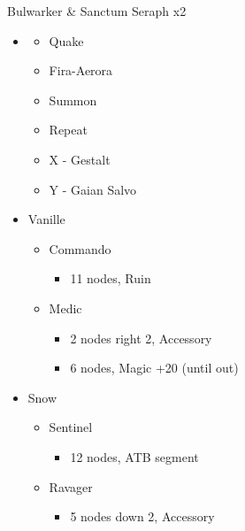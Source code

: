 \begin{multicols}{2}
\begin{battle}{Bulwarker \& Sanctum Seraph x2}
\begin{itemize}
    \item \second
    \begin{itemize}
        \item Quake
        \item Fira-Aerora
        \item Summon
        \item Repeat
        \item X - Gestalt
        \item Y - Gaian Salvo
    \end{itemize}
\end{itemize}
\end{battle}
\vfill
\begin{menu}
\begin{itemize}
    \crystarium
    \begin{itemize}
        \item Vanille
        \begin{itemize}
            \item Commando
            \begin{itemize}
                \item 11 nodes, Ruin
            \end{itemize}
            \item Medic
            \begin{itemize}
                \item 2 nodes right 2, Accessory
                \item 6 nodes, Magic +20 (until out)
            \end{itemize}
        \end{itemize}
        \item Snow
        \begin{itemize}
            \item Sentinel
            \begin{itemize}
                \item 12 nodes, ATB segment
            \end{itemize}
            \item Ravager
            \begin{itemize}
                \item 5 nodes down 2, Accessory
            \end{itemize}
        \end{itemize}

\end{itemize}
\end{itemize}
\end{menu}
\end{multicols}
